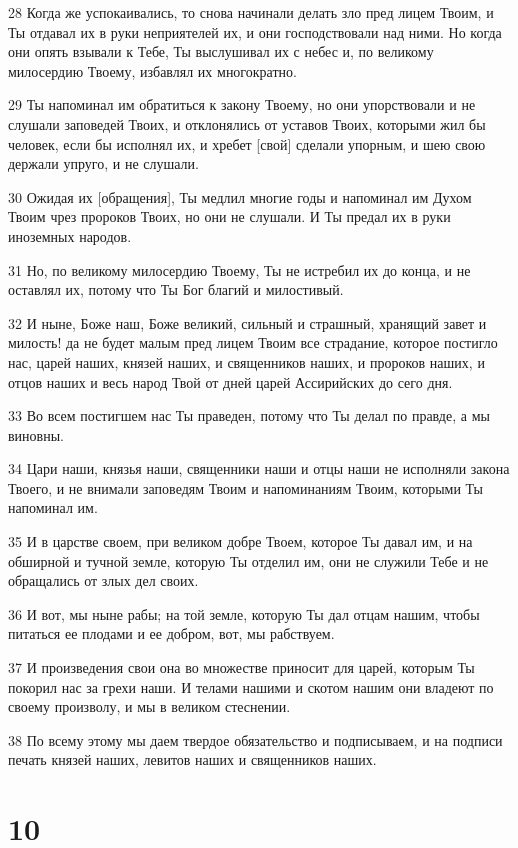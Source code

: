 \par 28 Когда же успокаивались, то снова начинали делать зло пред лицем Твоим, и Ты отдавал их в руки неприятелей их, и они господствовали над ними. Но когда они опять взывали к Тебе, Ты выслушивал их с небес и, по великому милосердию Твоему, избавлял их многократно.
\par 29 Ты напоминал им обратиться к закону Твоему, но они упорствовали и не слушали заповедей Твоих, и отклонялись от уставов Твоих, которыми жил бы человек, если бы исполнял их, и хребет [свой] сделали упорным, и шею свою держали упруго, и не слушали.
\par 30 Ожидая их [обращения], Ты медлил многие годы и напоминал им Духом Твоим чрез пророков Твоих, но они не слушали. И Ты предал их в руки иноземных народов.
\par 31 Но, по великому милосердию Твоему, Ты не истребил их до конца, и не оставлял их, потому что Ты Бог благий и милостивый.
\par 32 И ныне, Боже наш, Боже великий, сильный и страшный, хранящий завет и милость! да не будет малым пред лицем Твоим все страдание, которое постигло нас, царей наших, князей наших, и священников наших, и пророков наших, и отцов наших и весь народ Твой от дней царей Ассирийских до сего дня.
\par 33 Во всем постигшем нас Ты праведен, потому что Ты делал по правде, а мы виновны.
\par 34 Цари наши, князья наши, священники наши и отцы наши не исполняли закона Твоего, и не внимали заповедям Твоим и напоминаниям Твоим, которыми Ты напоминал им.
\par 35 И в царстве своем, при великом добре Твоем, которое Ты давал им, и на обширной и тучной земле, которую Ты отделил им, они не служили Тебе и не обращались от злых дел своих.
\par 36 И вот, мы ныне рабы; на той земле, которую Ты дал отцам нашим, чтобы питаться ее плодами и ее добром, вот, мы рабствуем.
\par 37 И произведения свои она во множестве приносит для царей, которым Ты покорил нас за грехи наши. И телами нашими и скотом нашим они владеют по своему произволу, и мы в великом стеснении.
\par 38 По всему этому мы даем твердое обязательство и подписываем, и на подписи печать князей наших, левитов наших и священников наших.

\chapter{10}

